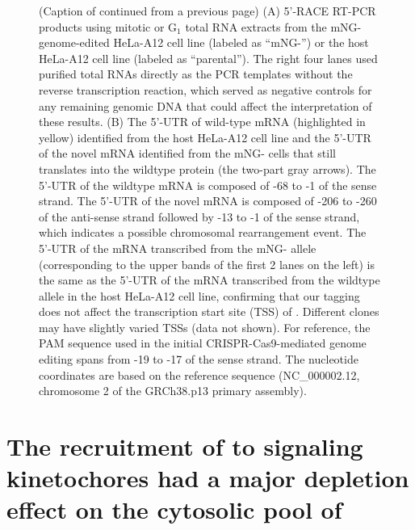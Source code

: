 \begin{figure}
    \noindent\justifying (Caption of  continued from a previous page) (A) 5'-RACE RT-PCR products using mitotic or G$_1$ total RNA extracts from the mNG- genome-edited HeLa-A12 cell line (labeled as ``mNG-'') or the host HeLa-A12 cell line (labeled as ``parental''). The right four lanes used purified total RNAs directly as the PCR templates without the reverse transcription reaction, which served as negative controls for any remaining genomic DNA that could affect the interpretation of these results. (B) The 5'-UTR of wild-type  mRNA (highlighted in yellow) identified from the host HeLa-A12 cell line and the 5'-UTR of the novel  mRNA identified from the mNG- cells that still translates into the wildtype  protein (the two-part gray arrows). The 5'-UTR of the wildtype  mRNA is composed of -68 to -1 of the sense strand. The 5'-UTR of the novel  mRNA is composed of -206 to -260 of the anti-sense strand followed by -13 to -1 of the sense strand, which indicates a possible chromosomal rearrangement event. The 5'-UTR of the mRNA transcribed from the mNG- allele (corresponding to the upper bands of the first 2 lanes on the left) is the same as the 5'-UTR of the mRNA transcribed from the wildtype  allele in the host HeLa-A12 cell line, confirming that our  tagging does not affect the transcription start site (TSS) of . Different clones may have slightly varied TSSs (data not shown). For reference, the PAM sequence used in the initial CRISPR-Cas9-mediated genome editing spans from -19 to -17 of the sense strand. The nucleotide coordinates are based on the reference sequence (NC\_000002.12, chromosome 2 of the GRCh38.p13 primary assembly).
\end{figure}

\section{The recruitment of  to signaling kinetochores had a major depletion effect on the cytosolic pool of }


